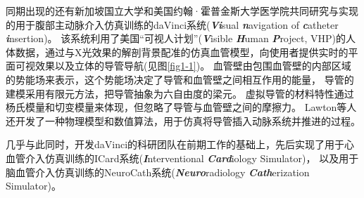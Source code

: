 同期出现的还有新加坡国立大学和美国约翰·霍普金斯大学医学院共同研究与实现的用于腹部主动脉介入仿真训练的daVinci系统(\textbf{\textit{Vi}}sual \textbf{\textit{n}}avigation of \textbf{\textit{c}}atheter \textbf{\textit{i}}nsertion\cite{Lawton2000daVinci})\cite{Anderson1996daVinci}\cite{Anderson1996adaVinci}\cite{Anderson1997daVinci}\cite{Anderson1997adaVinci}。
该系统利用了美国“可视人计划”(\textbf{\textit{V}}isible \textbf{\textit{H}}uman \textbf{\textit{P}}roject, VHP)\cite{vhpweb}的人体数据，通过与X光效果的解剖背景配准的仿真血管模型，向使用者提供实时的平面可视效果以及立体的导管导航\cite{Anderson1998daVinci}(见图\ref{fig1-1})。
血管壁由包围血管壁的内部区域的势能场来表示，这个势能场决定了导管和血管壁之间相互作用的能量，
导管的建模采用有限元方法，把导管抽象为六自由度的梁元\cite{Chui1996daVinci}\cite{Wang1996daVinci}。
虚拟导管的材料特性通过杨氏模量和切变模量来体现，但忽略了导管与血管壁之间的摩擦力\cite{Anderson1998daVinci}。
Lawton等人\cite{Lawton2000daVinci}还开发了一种物理模型和数值算法，用于仿真将导管插入动脉系统并推进的过程。


几乎与此同时，开发daVinci的科研团队在前期工作的基础上，先后实现了用于心血管介入仿真训练的ICard系统(\textbf{\textit{I}}nterventional \textbf{\textit{Card}}iology Simulator)\cite{Wang1997ICard}\cite{Chui1998ICard}\cite{Wang1998ICard}\cite{Cai2004ICard}\cite{Cai2006ICard}，
以及用于脑血管介入仿真训练的NeuroCath系统(\textbf{\textit{Neuro}}radiology \textbf{\textit{Cath}}erization Simulator)\cite{Ma2000NeuroCath}\cite{Nowinski2000NeuroCath}\cite{Ma2001NeuroCath}\cite{Li2001NeuroCath}\cite{Nowinski2001NeuroCath}\cite{Anderson2001NeuroCath}\cite{Chui2002NeuroCath}\cite{Anderson2002NeuroCath}\cite{Ma2004NeuroCath}\cite{Volkau2005Vessel}\cite{Ma2005NeuroCath}\cite{Ma2006NeuroCath}\cite{Ma2006aNeuroCath}\cite{Ma2007NeuroCath}。

